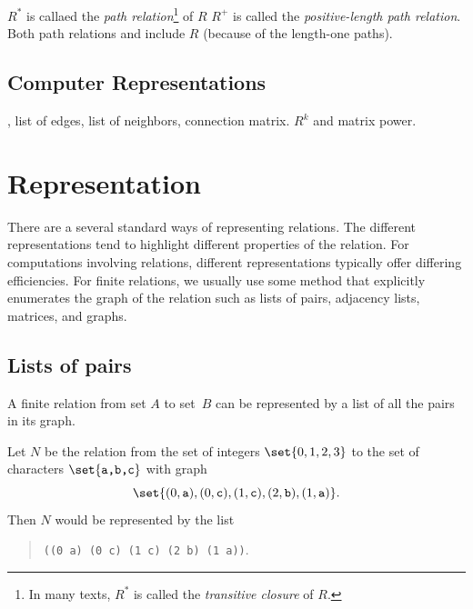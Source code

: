 $R^*$ is callaed the \emph{path relation}\footnote{In many texts, $R^*$ is
  called the \emph{transitive closure} of $R$.} of $R$ $R^+$ is called the
\emph{positive-length path relation}.  Both path relations and include $R$
(because of the length-one paths).


\subsection{Computer Representations 
}

, list of edges, list of neighbors, connection matrix.
$R^k$ and matrix power. 


\section{Representation}

There are a several standard ways of representing relations.  The
different representations tend to highlight different properties of the
relation.  For computations involving relations, different representations
typically offer differing efficiencies.  For finite relations, we usually
use some method that explicitly enumerates the graph of the relation such
as lists of pairs, adjacency lists, matrices, and graphs.

\subsection{Lists of pairs}

A finite relation from set $A$ to set~$B$ can be represented by a list of
all the pairs in its graph.

\begin{example} \label{ex:0123-abc}
Let $N$ be the relation from the set of integers $\set{0, 1, 2, 3}$ to the
set of characters $\set{\texttt{a,b,c}}$ with graph
\[
\set{(0,\texttt{a}), (0, \texttt{c}), (1, \texttt{c}), (2, \texttt{b}),
(1,\texttt{a})}.
\]
Then $N$ would be represented by the list
\begin{quote}
\texttt{((0 a) (0 c) (1 c) (2 b) (1 a))}.
\end{quote}
\end{example}


